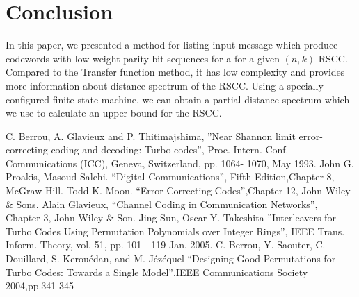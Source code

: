 \documentclass[11pt, oneside, dvipdfmx]{book}
\begin{document}
		

\section{Conclusion}
\label{sec6}

In this paper, we presented a method for listing input message which produce codewords with low-weight parity bit sequences for a for a given $(n,k)$ RSCC. Compared to the Transfer function method, it has low complexity and provides more information about distance spectrum of the RSCC. Using a specially configured finite state machine, we can obtain a partial distance spectrum which we use to calculate an upper bound for the RSCC.  


\begin{thebibliography}{99}
  C. Berrou, A. Glavieux and P. Thitimajshima, 
''Near Shannon limit error-correcting coding and
decoding: Turbo codes'', Proc. Intern. Conf. Communications (ICC), Geneva, 
Switzerland, pp. 1064-
1070, May 1993.
 John G. Proakis, Masoud Salehi. ``Digital Communications'', 
Fifth Edition,Chapter 8, McGraw-Hill.
 Todd K. Moon. ``Error Correcting Codes'',Chapter 12, John Wiley \& Sons.
Alain Glavieux, ``Channel Coding in Communication Networks'',\\ Chapter 3, John Wiley \& Son. 
 Jing Sun, Oscar Y. Takeshita ''Interleavers for Turbo Codes Using 
Permutation Polynomials over Integer Rings'', IEEE Trans. Inform. Theory, vol. 51, 
pp. 101 - 119  Jan. 2005.
 C. Berrou, Y. Saouter, C. Douillard, S. Kerouédan, and M. Jézéquel ``Designing Good Permutations for Turbo Codes: Towards a Single Model'',IEEE Communications Society 2004,pp.341-345

\end{thebibliography}
%
%
%
%
%
%


\end{document}
